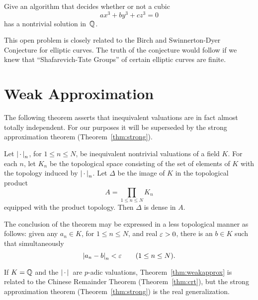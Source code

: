 \vspace{1ex}
Give an algorithm that decides whether or not a cubic $$ax^3 + by^3 + cz^3=0$$
has a nontrivial solution in~$\mathbb{Q}$.
\vspace{1ex}

This open problem is closely related to the Birch and Swinnerton-Dyer
Conjecture for elliptic
curves.  The truth of the conjecture would
follow if we knew that ``Shafarevich-Tate
Groups'' of certain elliptic curves are
finite.


\section{Weak Approximation}

The following theorem asserts that inequivalent valuations are in fact
almost totally independent.  For our purposes it will be superseded by
the strong approximation theorem (Theorem~\ref{thm:strong}).

\begin{theorem}\label{thm:weakapprox}
  Let $\left|\,\cdot\,\right|_n$, for $1\leq n \leq N$, be inequivalent nontrivial
  valuations of a field $K$.  For each $n$, let $K_n$ be the
  topological space consisting of the set of elements of $K$ with the
  topology induced by $\left|\,\cdot\,\right|_n$.  Let $\Delta$ be the image of $K$
  in the topological product $$A=\prod_{1\leq n\leq N} K_n$$ equipped
  with the product topology.  Then $\Delta$ is dense in $A$.
\end{theorem}
The conclusion of the theorem may be expressed in a less topological
manner as follows: given any $a_n\in K$, for $1\leq n \leq N$, and
real $\varepsilon>0$, there is an $b\in K$ such that simultaneously
$$
  \left|a_n - b\right|_n  < \varepsilon \qquad (1\leq n\leq N).
$$

If $K=\mathbb{Q}$ and the $\left|\,\cdot\,\right|{}$ are $p$-adic valuations,
Theorem~\ref{thm:weakapprox} is related to the Chinese Remainder
Theorem (Theorem~\ref{thm:crt}), but the strong approximation theorem 
(Theorem~\ref{thm:strong}) is the
real generalization.  


